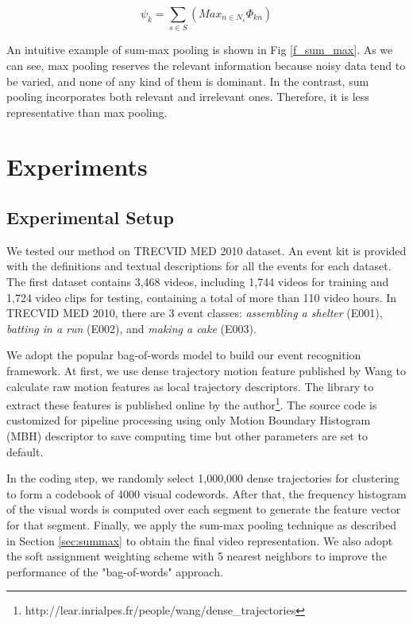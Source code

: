\begin{equation}\psi_{k} = \sum_{s \in S}(Max_{n \in N_{s}}\Phi_{kn})\end{equation}

An intuitive example of sum-max pooling is shown in Fig \ref{f_sum_max}. As we can see, max pooling reserves the relevant information because noisy data tend to be varied, and none of any kind of them is dominant. In the contrast, sum pooling incorporates both relevant and irrelevant ones. Therefore, it is less representative than max pooling.

\section{Experiments}
\label{sec:typestyle}
\subsection{Experimental Setup}
We tested our method on TRECVID MED 2010 dataset. An event kit is provided with the definitions and textual descriptions for all the events for each dataset. The first dataset contains 3,468 videos, including 1,744 videos for training and 1,724 video clips for testing, containing a total of more than 110 video hours. In TRECVID MED 2010, there are 3 event classes: \textit{assembling a shelter} (E001), \textit{batting in a run} (E002), and \textit{making a cake} (E003).

We adopt the popular bag-of-words model to build our event recognition framework. At first, we use dense trajectory motion feature published by Wang \cite{wang:2011:inria-00583818:1} to calculate raw motion features as local trajectory descriptors. The library to extract these features is published online by the author\footnote{http://lear.inrialpes.fr/people/wang/dense\_trajectories}. The source code is customized for pipeline processing using only Motion Boundary Histogram (MBH) descriptor to save computing time but other parameters are set to default. 

In the coding step, we randomly select 1,000,000 dense trajectories for clustering to form a codebook of 4000 visual codewords. After that, the frequency histogram of the visual words is computed over each segment to generate the feature vector for that segment. Finally, we apply the sum-max pooling technique as described in Section \ref{sec:summax} to obtain the final video representation. We also adopt the soft assignment weighting scheme \cite{Jiang:2007:TOB} with 5 nearest neighbors to improve the performance of the "bag-of-words" approach.

